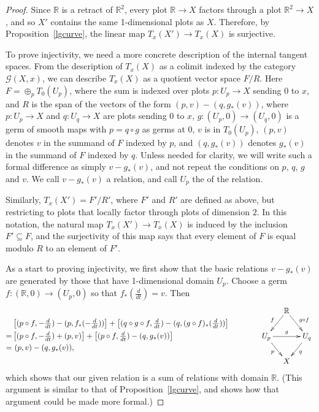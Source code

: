 \documentclass{amsart}
\newcommand{\dfn}[1]{\textbf{\boldmath{#1}}}
\theoremstyle{remark}
\newcommand{\ra}{\to}
\newcommand{\cG}{{\mathcal{G}}}
\newcommand{\ddt}{{\textstyle\frac{d}{dt}}}
\def \R{\mathbb{R}}
\begin{document}
\begin{proof}
Since $\R$ is a retract of $\R^2$,
every plot $\R \to X$ factors through a plot $\R^2 \to X$,
and so $X'$ contains the same 1-dimensional plots as $X$.
Therefore, by Proposition~\ref{lgcurve}, the linear map $T_x(X') \ra T_x(X)$ is surjective.

To prove injectivity, we need a more concrete description of the internal tangent
spaces. From the description of $T_x(X)$ as a colimit indexed by the
category $\cG(X,x)$, we can describe $T_x(X)$ as a quotient vector space $F/R$.
Here $F = \oplus_p T_0(U_p)$, where the sum is indexed over plots $p : U_p \to X$
sending $0$ to $x$,
and $R$ is the span of the vectors of the form $(p,v) - (q, g_*(v))$,
where $p : U_p \to X$ and $q : U_q \to X$ are plots sending $0$ to $x$,
$g : (U_p,0) \to (U_q,0)$ is a germ of smooth maps with $p = q \circ g$ as germs at $0$,
$v$ is in $T_0(U_p)$,
$(p,v)$ denotes $v$ in the summand of $F$ indexed by $p$,
and $(q, g_*(v))$ denotes $g_*(v)$ in the summand of $F$ indexed by $q$.
Unless needed for clarity, we will write such a formal difference as simply $v - g_*(v)$,
and not repeat the conditions on $p$, $q$, $g$ and $v$.
We call $v - g_*(v)$ a \dfn{basic} relation, and call $U_p$ the \dfn{domain} of the relation.
%
%

Similarly, $T_x(X') = F'/R'$, where $F'$ and $R'$ are defined as above,
but restricting to plots that locally factor through plots of dimension $2$.
In this notation, the natural map $T_x(X') \to T_x(X)$ is induced
by the inclusion $F' \subseteq F$, and the surjectivity of this map
says that every element of $F$ is equal modulo $R$ to an element of $F'$.

As a start to proving injectivity, we first show that the basic relations
$v - g_*(v)$ are generated by those that have 1-dimensional domain $U_p$.
Choose a germ $f : (\R,0) \to (U_p,0)$ so that $f_*(\ddt) = v$.
Then
\[
\begin{aligned}
  & \left[ (p \circ f, -\ddt) - (p, f_*(-\ddt)) \right] + \left[ (q \circ g \circ f, \ddt) - (q, (g \circ f)_*(\ddt)) \right ] \\
 =& \left[ (p \circ f, -\ddt) + (p, v)          \right] + \left[ (p \circ f, \ddt)  - (q, g_*(v))        \right ] \\
 =&\ (p, v) - (q, g_*(v)) ,
\end{aligned}
\qquad\qquad
\vcenter{
\xymatrix@C-14pt@R-6pt{        &  \R \ar[ld]_f \ar[rd]^{g \circ f} & \\
           U_p \ar[dr]_p \ar[rr]^g     &&  U_q \ar[dl]^q  \\
                         &   X & }
}
\]
which shows that our given relation is a sum of relations with
domain $\R$. %
(This argument is similar to that of Proposition~\ref{lgcurve}, and shows
how that argument could be made more formal.)


\end{proof}
\end{document}
